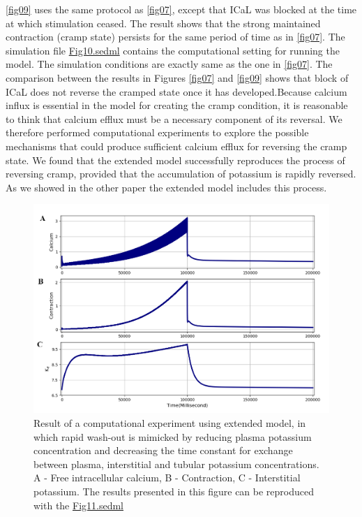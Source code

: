 \documentclass[fleqn,10pt]{physiome}
\begin{document}
\autoref{fig09} uses the same protocol as \autoref{fig07}, except that ICaL was blocked at the time at which stimulation ceased. The result shows that the strong maintained contraction (cramp state) persists for the same period of time as in \autoref{fig07}. The simulation file \href{http://models.cellml.org/workspace/5f4/file/4071d5b4ec40c5e2b845a7a75e942df1966d2ba2/Fig10.sedml}{Fig10.sedml} contains the computational setting for running the model. The simulation conditions are exactly same as the one in \autoref{fig07}.\newline 
The comparison between the results in Figures \ref{fig07} and \ref{fig09} shows that block of ICaL does not reverse the cramped state once it has developed.Because calcium influx is essential in the model for creating the cramp condition, it is reasonable to think that calcium efflux must be a necessary component of its reversal. We therefore performed computational experiments to explore the possible mechanisms that could produce sufficient calcium efflux for reversing the cramp state. We found that the extended model successfully reproduces the process of reversing cramp, provided that the accumulation of potassium is rapidly reversed. As we showed in the other paper \citep{Noble2019Incorporation} the extended model includes this process.\newpage
\begin{figure}[h!]
\centering
\includegraphics[width=0.9\linewidth]{figure10}
\caption{Result of a computational experiment using extended model, in which rapid wash-out is mimicked by reducing plasma potassium concentration and decreasing the time constant for exchange between plasma, interstitial and tubular potassium concentrations. A - Free intracellular calcium, B - Contraction, C - Interstitial potassium. The results presented in this figure can be reproduced with the \href{https://models.physiomeproject.org/workspace/5f4/file/26289d9227fbf4f66ca8106d8bf80ff9a51a5ac6/Fig11.sedml}{Fig11.sedml}}
\label{fig10}
\end{figure}
\end{document}
